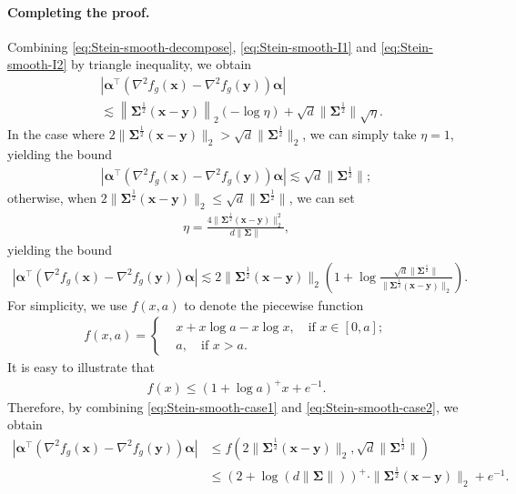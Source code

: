 \paragraph{Completing the proof.} Combining \eqref{eq:Stein-smooth-decompose}, \eqref{eq:Stein-smooth-I1} and \eqref{eq:Stein-smooth-I2} by triangle inequality, we obtain
\begin{align*}
&\left|\bm{\alpha}^\top (\nabla^2 f_g(\bm{x})-\nabla^2 f_g(\bm{y})) \bm{\alpha}\right| \\ 
&\lesssim \left\|\bm{\Sigma}^{\frac{1}{2}}(\bm{x} - \bm{y})\right\|_2 (-\log \eta) + \sqrt{d}\|\bm{\Sigma}^{\frac{1}{2}}\| \sqrt{\eta}.
\end{align*}
In the case where $2\|\bm{\Sigma}^{\frac{1}{2}}(\bm{x} - \bm{y})\|_2 >\sqrt{d}\|\bm{\Sigma}^{\frac{1}{2}}\|_2$, we can simply take $\eta=1$, yielding the bound
\begin{align}\label{eq:Stein-smooth-case1}
\left|\bm{\alpha}^\top (\nabla^2 f_g(\bm{x})-\nabla^2 f_g(\bm{y})) \bm{\alpha}\right| \lesssim \sqrt{d} \|\bm{\Sigma}^{\frac{1}{2}}\|;
\end{align}
otherwise, when $2\|\bm{\Sigma}^{\frac{1}{2}}(\bm{x} - \bm{y})\|_2 \leq \sqrt{d}\|\bm{\Sigma}^{\frac{1}{2}}\|$, we can set
\begin{align*}
\eta = \frac{4\|\bm{\Sigma}^{\frac{1}{2}}(\bm{x} - \bm{y})\|_2^2}{d\|\bm{\Sigma}\|},
\end{align*}
yielding the bound 
\begin{align}\label{eq:Stein-smooth-case2}
\left|\bm{\alpha}^\top (\nabla^2 f_g(\bm{x})-\nabla^2 f_g(\bm{y})) \bm{\alpha}\right| \lesssim 2\|\bm{\Sigma}^{\frac{1}{2}}(\bm{x} - \bm{y})\|_2 \left(1+\log \frac{\sqrt{d}\|\bm{\Sigma}^{\frac{1}{2}}\|}{\|\bm{\Sigma}^{\frac{1}{2}}(\bm{x} - \bm{y})\|_2}\right).
\end{align}
For simplicity, we use $f(x,a)$ to denote the piecewise function
\begin{align*}
f(x,a) = \begin{cases}
&x + x\log a - x \log x, \quad \text{if } x \in [0,a]; \\ 
&a, \quad \text{if } x > a.
\end{cases}
\end{align*}
It is easy to illustrate that
\begin{align*}
f(x) \leq (1+\log a)^+ x + e^{-1}.
\end{align*}
Therefore, by combining \eqref{eq:Stein-smooth-case1} and \eqref{eq:Stein-smooth-case2}, we obtain
\begin{align*}
\left|\bm{\alpha}^\top (\nabla^2 f_g(\bm{x})-\nabla^2 f_g(\bm{y})) \bm{\alpha}\right|  &\leq f(2\|\bm{\Sigma}^{\frac{1}{2}}(\bm{x} - \bm{y})\|_2,\sqrt{d}\|\bm{\Sigma}^{\frac{1}{2}}\|) \\ 
&\leq (2+\log (d\|\bm{\Sigma}\|))^+ \cdot \|\bm{\Sigma}^{\frac{1}{2}}(\bm{x} - \bm{y})\|_2 + e^{-1}.
\end{align*}

